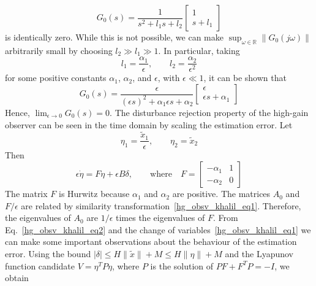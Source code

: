 \documentclass[12pt,a4paper,oneside]{book}
\begin{document}
\begin{onehalfspace}
\begin{example}
	\begin{equation*}
		G_0(s)=\frac{1}{s^2+l_1s+l_2}\begin{bmatrix} 1 \\[6pt] s + l_1 \end{bmatrix}
	\end{equation*} 
	is identically zero. While this is not possible, we can make $\sup_{\omega\in\mathbb{R}}\|G_0(j\omega)\|$ arbitrarily small by choosing $l_2\gg l_1\gg 1$. In particular, taking 
	\begin{equation*}
		l_1=\frac{\alpha_1}{\epsilon},\qquad l_2=\frac{\alpha_2}{\epsilon^2}
	\end{equation*}
	for some positive constants $\alpha_1$, $\alpha_2$, and $\epsilon$, with $\epsilon\ll 1$, it can be shown that 
	\begin{equation*}
		G_0(s)=\frac{\epsilon}{(\epsilon s)^2+\alpha_1\epsilon s +\alpha_2}\begin{bmatrix} \epsilon \\[6pt] \epsilon s + \alpha_1 \end{bmatrix}
	\end{equation*}
	Hence, $\lim_{\epsilon\rightarrow0}G_0(s)=0$. The disturbance rejection property of the high-gain observer can be seen in the time domain by scaling the estimation error. Let
	\begin{equation}\label{hg_obsv_khalil_eq1}
		\eta_1=\frac{\tilde{x}_1}{\epsilon},\qquad \eta_2=\tilde{x}_2
	\end{equation}
	Then
	\begin{equation}\label{hg_obsv_khalil_eq2}
		\epsilon\dot{\eta}=F\eta+\epsilon B\delta,\qquad\text{where}\quad F=\begin{bmatrix} -\alpha_1 & 1 \\[6pt] -\alpha_2 & 0 \end{bmatrix}
	\end{equation}
	The matrix $F$ is Hurwitz because $\alpha_1$ and $\alpha_2$ are positive. The matrices $A_0$ and $F/\epsilon$ are related by similarity transformation~\eqref{hg_obsv_khalil_eq1}. Therefore, the eigenvalues of $A_0$ are $1/\epsilon$ times the eigenvalues of $F$. From Eq.~\eqref{hg_obsv_khalil_eq2} and the change of variables~\eqref{hg_obsv_khalil_eq1} we can make some important observations about the behaviour of the estimation error. Using the bound $|\delta|\le H\|\tilde{x}\|+M\le H\|\eta\|+M$ and the Lyapunov function candidate $V=\eta^TP\eta$, where $P$ is the solution of $PF+F^TP=-I$, we obtain
	\begin{equation*}

\end{equation*}
\end{example}
\end{onehalfspace}
\end{document}
